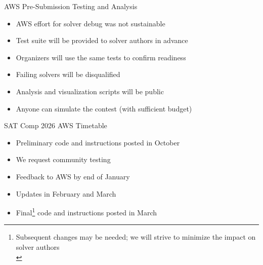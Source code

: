 \documentclass{beamer}
\begin{document}
\begin{frame}{AWS Pre-Submission Testing and Analysis}

\large

\begin{itemize}
\item AWS effort for solver debug was not sustainable\\[10pt]
\item Test suite will be provided to solver authors in advance\\[10pt]
\item Organizers will use the same tests to confirm readiness\\[10pt]
\item Failing solvers will be disqualified\\[10pt]
\item Analysis and visualization scripts will be public\\[10pt]
\item Anyone can simulate the contest (with sufficient budget)
\end{itemize}

\end{frame}


\begin{frame}{SAT Comp 2026 AWS Timetable}

\large

\begin{itemize}
\item Preliminary code and instructions posted in October\\[10pt]
\item We request community testing\\[10pt]
\item Feedback to AWS by end of January\\[10pt]
\item Updates in February and March\\[10pt]
\item Final\footnote{\normalsize Subsequent changes may be needed; we will strive to minimize the impact on solver authors\\[20pt]} code and instructions posted in March
\end{itemize}

\end{frame}
\end{document}
